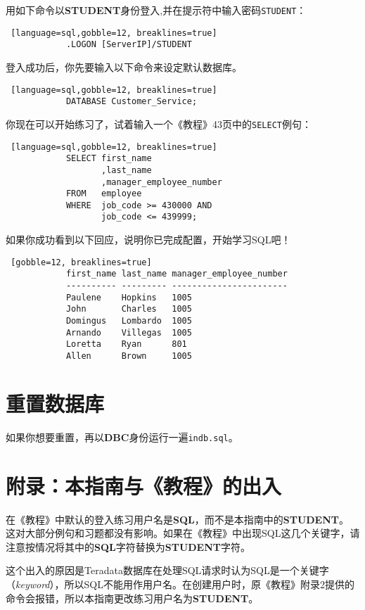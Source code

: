 \documentclass{article}
\begin{document}
		用如下命令以\textbf{STUDENT}身份登入,并在提示符中输入密码\lstinline|STUDENT|：

		\begin{lstlisting} [language=sql,gobble=12, breaklines=true]
			.LOGON [ServerIP]/STUDENT
		\end{lstlisting}

		登入成功后，你先要输入以下命令来设定默认数据库。

		\begin{lstlisting} [language=sql,gobble=12, breaklines=true]
			DATABASE Customer_Service;
		\end{lstlisting}

		你现在可以开始练习了，试着输入一个《教程》43页中的\lstinline|SELECT|例句：

		\begin{lstlisting} [language=sql,gobble=12, breaklines=true]
			SELECT first_name
			       ,last_name
			       ,manager_employee_number
			FROM   employee
			WHERE  job_code >= 430000 AND
			       job_code <= 439999;
		\end{lstlisting}

		如果你成功看到以下回应，说明你已完成配置，开始学习SQL吧！

		\begin{lstlisting} [gobble=12, breaklines=true]
			first_name last_name manager_employee_number
			---------- --------- -----------------------
			Paulene    Hopkins   1005
			John       Charles   1005
			Domingus   Lombardo  1005
			Arnando    Villegas  1005
			Loretta    Ryan      801
			Allen      Brown     1005
		\end{lstlisting}

	\section{重置数据库}

		如果你想要重置，再以\textbf{DBC}身份运行一遍\lstinline{indb.sql}。

			
		\section*{附录：本指南与《教程》的出入}

			在《教程》中默认的登入练习用户名是\textbf{SQL}，而不是本指南中的\textbf{STUDENT}。
			这对大部分例句和习题都没有影响。如果在《教程》中出现SQL这几个关键字，请注意按情况将其中的\textbf{SQL}字符替换为\textbf{STUDENT}字符。

			这个出入的原因是Teradata数据库在处理SQL请求时认为SQL是一个关键字（\textit{keyword}），所以SQL不能用作用户名。在创建用户时，原《教程》附录2提供的命令会报错，所以本指南更改练习用户名为\textbf{STUDENT}。
\end{document}
